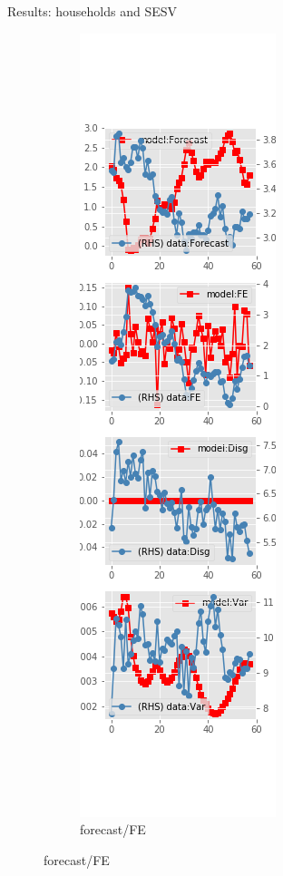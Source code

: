 \documentclass{beamer}
\begin{document}
\begin{frame}{Results: households and SESV}
\begin{figure}[ht]
\begin{subfigure}[b]{0.19\textwidth}
		\end{subfigure}
		\hfill
		\begin{subfigure}[b]{0.19\textwidth}
			\caption{forecast/FE}
			\includegraphics[width=\textwidth, height = 0.8\textheight]{figuresDraft/sce_se_est_sv_diag2.png}

\end{subfigure}
\end{figure}
\end{frame}
\end{document}
